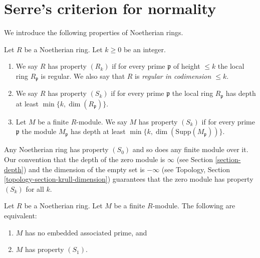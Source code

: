 \section{Serre's criterion for normality}
\label{section-serre-criterion}

\noindent
We introduce the following properties of Noetherian rings.

\begin{definition}
\label{definition-conditions}
Let $R$ be a Noetherian ring.
Let $k \geq 0$ be an integer.
\begin{enumerate}
\item We say $R$ has property {\it $(R_k)$} if for every prime $\mathfrak p$
of height $\leq k$ the local ring $R_{\mathfrak p}$ is regular.
We also say that $R$ is {\it regular in codimension $\leq k$}.
\item We say $R$ has property {\it $(S_k)$} if for every prime $\mathfrak p$
the local ring $R_{\mathfrak p}$ has depth at least
$\min\{k, \dim(R_{\mathfrak p})\}$.
\item Let $M$ be a finite $R$-module. We say $M$ has property $(S_k)$
if for every prime $\mathfrak p$ the module
$M_{\mathfrak p}$ has depth at least
$\min\{k, \dim(\text{Supp}(M_{\mathfrak p}))\}$.
\end{enumerate}
\end{definition}

\noindent
Any Noetherian ring has property $(S_0)$ and so does any finite module
over it. Our convention that the depth of the zero module is $\infty$
(see Section \ref{section-depth}) and the dimension of the empty set is
$-\infty$ (see Topology, Section \ref{topology-section-krull-dimension})
guarantees that the zero module has property $(S_k)$ for all $k$.

\begin{lemma}
\label{lemma-criterion-no-embedded-primes}
Let $R$ be a Noetherian ring.
Let $M$ be a finite $R$-module.
The following are equivalent:
\begin{enumerate}
\item $M$ has no embedded associated prime, and
\item $M$ has property $(S_1)$.
\end{enumerate}
\end{lemma}

